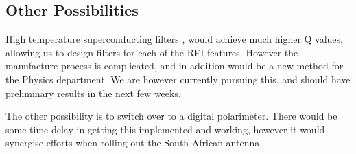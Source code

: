% 
% 

\clearpage

\subsection{Other Possibilities}

High temperature superconducting filters \cite{splitRingHTS}, would achieve much higher Q values, allowing us to design filters for each of the RFI features. However the manufacture process is complicated, and in addition would be a new method for the Physics department. We are however currently pursuing this, and should have preliminary results in the next few weeks.

The other possibility is to switch over to a digital polarimeter. There would be some time delay in getting this implemented and working, however it would synergise efforts when rolling out the South African antenna. 













\clearpage